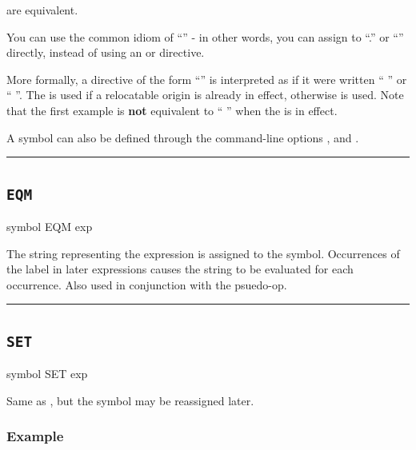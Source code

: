  are equivalent.

You can use the common idiom of ``'' - in other words, you can assign to ``.'' or ``\text{*}'' directly, instead of using an  or  directive.

More formally, a directive of the form ``'' is
interpreted as if it were written `` '' or  `` ''.
The  is used if a relocatable origin is already in effect,
otherwise  is used. Note that the first example is \textbf{not}
equivalent to `` '' when the  is in effect.

A symbol can also be defined through the command-line options ,  and .\\

\hrule
\subsection{\texttt{EQM}}
\label{pseudoop:eqm}

\begin{usage}
symbol EQM exp
\end{usage}

The string representing the expression is assigned to the
symbol.  Occurrences of the label in later expressions causes
the string to be evaluated for each occurrence.  Also used in
conjunction with the  psuedo-op.\\

\hrule
\subsection{\texttt{SET}}
\label{pseudoop:set}

\begin{usage}
symbol SET exp
\end{usage}


Same as , but the symbol may be reassigned later.\\

\subsubsection{Example}

